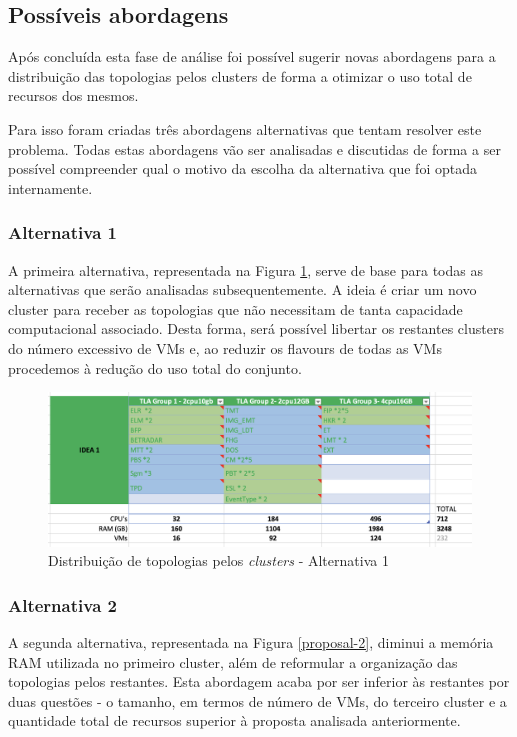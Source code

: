\subsection{Possíveis abordagens}

Após concluída esta fase de análise foi possível sugerir novas abordagens para a distribuição
das topologias pelos \glspl{cluster} de forma a otimizar o uso total de recursos dos mesmos.

Para isso foram criadas três abordagens alternativas que tentam resolver este problema. Todas estas
abordagens vão ser analisadas e discutidas de forma a ser possível compreender qual o motivo da
escolha da alternativa que foi optada internamente.

\subsubsection{Alternativa 1}

A primeira alternativa, representada na Figura \ref{proposal-1}, serve de base para todas as
alternativas que serão analisadas subsequentemente. A ideia é criar um novo \gls{cluster}
para receber as topologias que não necessitam de tanta capacidade computacional associado. Desta 
forma, será possível libertar os restantes \glspl{cluster} do número excessivo de \acp{VM} 
e, ao reduzir os \glspl{flavour} de todas as \acp{VM} procedemos à redução do uso total do
conjunto.

\begin{figure}[H]
  \centerline{\includegraphics[scale=0.4]{media/content/analise/proposal-1.png}}
  \caption{Distribuição de topologias pelos \textit{clusters} - Alternativa 1}
  \label{proposal-1}
\end{figure}

\subsubsection{Alternativa 2}

A segunda alternativa, representada na Figura \ref{proposal-2}, diminui a memória RAM utilizada no
primeiro \gls{cluster}, além de reformular a organização das topologias pelos restantes. Esta 
abordagem acaba por ser inferior às restantes por duas questões - o tamanho, em termos de número 
de \acp{VM}, do terceiro \gls{cluster} e a quantidade total de recursos superior à proposta
analisada anteriormente.

